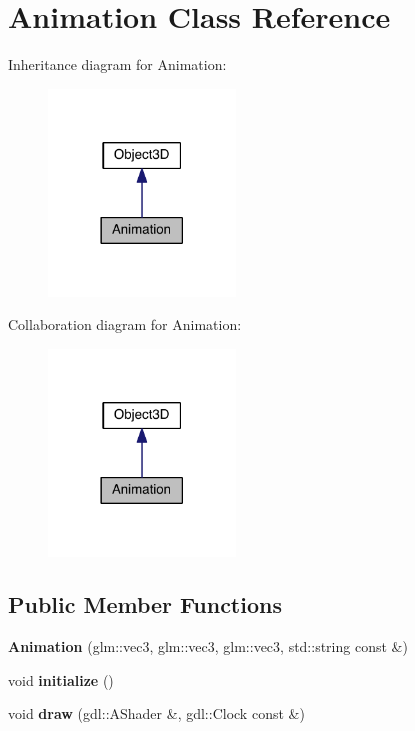 \hypertarget{class_animation}{}\section{Animation Class Reference}
\label{class_animation}


Inheritance diagram for Animation\+:\nopagebreak
\begin{figure}[H]
\begin{center}
\leavevmode
\includegraphics[width=141pt]{class_animation__inherit__graph}
\end{center}
\end{figure}


Collaboration diagram for Animation\+:\nopagebreak
\begin{figure}[H]
\begin{center}
\leavevmode
\includegraphics[width=141pt]{class_animation__coll__graph}
\end{center}
\end{figure}
\subsection*{Public Member Functions}
\begin{DoxyCompactItemize}
\item 
\hypertarget{class_animation_aa67706c10d23d868c5a3f1ebb718b5f5}{}{\bfseries Animation} (glm\+::vec3, glm\+::vec3, glm\+::vec3, std\+::string const \&)\label{class_animation_aa67706c10d23d868c5a3f1ebb718b5f5}

\item 
\hypertarget{class_animation_a9fd12a6f728e11a6ee5065ce521b4dd2}{}void {\bfseries initialize} ()\label{class_animation_a9fd12a6f728e11a6ee5065ce521b4dd2}

\item 
\hypertarget{class_animation_afc14139c9c4cbce0edaedc1510dc45ca}{}void {\bfseries draw} (gdl\+::\+A\+Shader \&, gdl\+::\+Clock const \&)\label{class_animation_afc14139c9c4cbce0edaedc1510dc45ca}

\end{DoxyCompactItemize}

